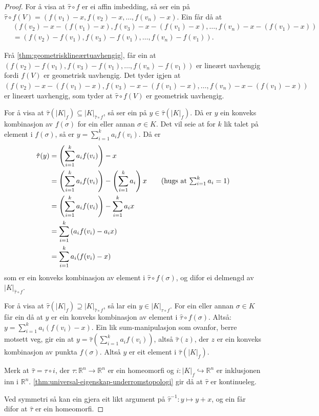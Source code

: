 \documentclass[a4paper, 12pt, norsk]{article}
\theoremstyle{plain}
\theoremstyle{definition}
\newcommand{\Rb}{\mathbb{R}}
\newcommand{\gr}[1]{ \lvert #1 \rvert } %
\newcommand{\tuple}[1]{ \left( #1 \right) } %
\begin{document}
\begin{proof}
	For å visa at \( \hat{\tau} \circ f \) er ei affin imbedding, så ser ein på \( \hat{\tau} \circ f(V) = (f(v_1)-x, f(v_2)-x, \dots, f(v_n)-x) \). Ein får då at 
	\begin{align*}
		&(f(v_2)-x-(f(v_1)-x), f(v_3)-x-(f(v_1)-x), \dots, f(v_n)-x-(f(v_1)-x)) \\
		&= ( f(v_2)-f(v_1), f(v_3)-f(v_1), \dots, f(v_n)-f(v_1) ) .
	\end{align*}

	Frå \autoref{thm:geometrisklineærtuavhengig}, får ein at \( ( f(v_2)-f(v_1), f(v_3)-f(v_1), \dots, f(v_n)-f(v_1) ) \) er lineært uavhengig fordi \( f(V) \) er geometrisk uavhengig. Det tyder igjen at \( (f(v_2)-x-(f(v_1)-x), f(v_3)-x-(f(v_1)-x), \dots, f(v_n)-x-(f(v_1)-x)) \) er lineært uavhengig, som tyder at \( \hat{\tau} \circ f(V) \) er geometrisk uavhengig.

	For å visa at \( \hat{\tau}(\gr{K}_f) \subseteq \gr{K}_{\hat{\tau} \circ f} \), så ser ein på \( y \in \hat{\tau}(\gr{K}_f) \). Då er \( y \) ein konveks kombinasjon av \( f(\sigma) \) for ein eller annan \( \sigma \in K \). Det vil seie at for \( k \) lik talet på element i \( f(\sigma) \), så er \( y = \sum_{i=1}^k a_i f(v_i) \). Då er
	\begin{align*}
		\hat{\tau}(y) &= \left(\sum_{i=1}^k a_i f(v_i)\right) - x \\
		&= \left(\sum_{i=1}^k a_i f(v_i)\right)-\left(\sum_{i=1}^k a_i \right)x 
		\tag{hugs at \( \sum_{i=1}^k a_i = 1 \)} \\
		&= \left(\sum_{i=1}^k a_i f(v_i)\right)-\sum_{i=1}^k a_i x \\
		&= \sum_{i=1}^k \tuple{a_i f(v_i) - a_i x} \\
		&= \sum_{i=1}^k a_i(f(v_i) - x)
	\end{align*}
	som er ein konveks kombinasjon av element i \( \hat{\tau} \circ f(\sigma) \), og difor ei delmengd av \( \gr{K}_{\hat{\tau} \circ f} \).

	For å visa at \( \hat{\tau}(\gr{K}_f) \supseteq \gr{K}_{\hat{\tau} \circ f} \), så lar ein \( y \in \gr{K}_{\hat{\tau} \circ f} \). For ein eller annan \( \sigma \in K \) får ein då at \( y \) er ein konveks kombinasjon av element i \( \hat{\tau}\circ f(\sigma) \). Altså: \(  y = \sum_{i=1}^k a_i (f(v_i) - x) \). Ein lik sum-manipulasjon som ovanfor, berre motsett veg, gir ein at \( y = \hat{\tau}\left(\sum_{i=1}^k a_i f(v_i)\right) \), altså \( \hat{\tau}(z) \), der \( z \) er ein konveks kombinasjon av punkta \( f(\sigma) \). Altså \( y \) er eit element i \( \hat{\tau}(\gr{K}_f) \).

	Merk at \( \hat{\tau} = \tau \circ i \), der \( \tau: \Rb^n \to \Rb^n \) er ein homeomorfi og \( i: \gr{K}_f \hookrightarrow \Rb^n \) er inklusjonen inn i \( \Rb^n \). \autoref{thm:universal-eigenskap-underromstopologi} gir då at \( \hat{\tau} \) er kontinueleg.

	Ved symmetri så kan ein gjera eit likt argument på \( \hat{\tau}^{-1}: y \mapsto y+x \), og ein får difor at \( \hat{\tau} \) er ein homeomorfi.
\end{proof}
\end{document}

